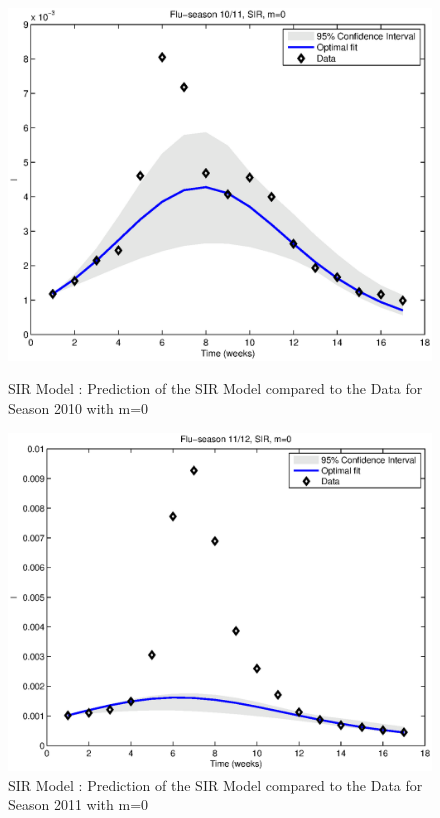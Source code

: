 \documentclass[11pt, a4paper]{article}
\begin{document}
\begin{figure}[h]
\FloatBarrier
\centering
    \includegraphics[height = 0.25\textheight]{figures/SIR_prediction_season1_m=0.eps}
    \caption{SIR Model : Prediction of the SIR Model compared to the Data for Season 2010 with m=0}
    \label{fig:sir0_pred1}
    \includegraphics[height = 0.25\textheight]{figures/SIR_prediction_season2_m=0.eps}
    \caption{SIR Model : Prediction of the SIR Model compared to the Data for Season 2011 with m=0}
    \label{fig:sir0_pred2}

\end{figure}
\end{document}
